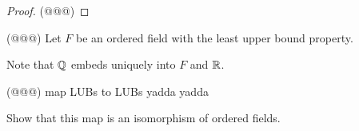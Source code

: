 \begin{proof}
(@@@)
\end{proof}


\Exercises%

\begin{exercise}
(@@@) Let \(F\) be an ordered field with the least upper bound property.
\begin{proplist}
\item Note that \(\mathbb{Q}\) embeds uniquely into \(F\) and \(\mathbb{R}\).
\item (@@@) map LUBs to LUBs yadda yadda
\item Show that this map is an isomorphism of ordered fields.
\end{proplist}
\end{exercise}
